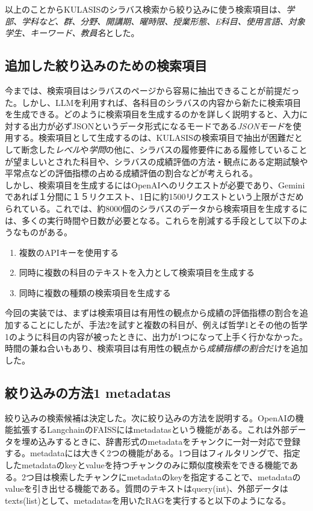 以上のことからKULASISのシラバス検索から絞り込みに使う検索項目は、\emph{学部、学科など、群、分野、開講期、曜時限、授業形態、E科目、使用言語、対象学生、キーワード、教員名}とした。\\

\subsection{追加した絞り込みのための検索項目}
今までは、検索項目はシラバスのページから容易に抽出できることが前提だった。しかし、LLMを利用すれば、各科目のシラバスの内容から新たに検索項目を生成できる。どのように検索項目を生成するのかを詳しく説明すると、入力に対する出力が必ずJSONというデータ形式になるモードである\emph{JSONモード}を使用する。検索項目として生成するのは、KULASISの検索項目で抽出が困難だとして断念した\emph{レベル}や\emph{学問}の他に、シラバスの履修要件にある履修していることが望ましいとされた科目や、シラバスの成績評価の方法・観点にある定期試験や平常点などの評価指標の占める成績評価の割合などが考えられる。\\

しかし、検索項目を生成するにはOpenAIへのリクエストが必要であり、Geminiであれば１分間に１５リクエスト、1日に約1500リクエストという上限がさだめられている。これでは、約8000個のシラバスのデータから検索項目を生成するには、多くの実行時間や日数が必要となる。これらを削減する手段として以下のようなものがある。\\

\begin{enumerate}
  \item 複数のAPIキーを使用する
  \item 同時に複数の科目のテキストを入力として検索項目を生成する
  \item 同時に複数の種類の検索項目を生成する
\end{enumerate}

今回の実装では、まずは検索項目は有用性の観点から成績の評価指標の割合を追加することにしたが、手法2を試すと複数の科目が、例えば哲学1とその他の哲学1のように科目の内容が被ったときに、出力が1つになって上手く行かなかった。時間の兼ね合いもあり、検索項目は有用性の観点から\emph{成績指標の割合}だけを追加した。

\subsection{絞り込みの方法1 metadatas}
絞り込みの検索候補は決定した。次に絞り込みの方法を説明する。OpenAIの機能拡張するLangchainのFAISSにはmetadatasという機能がある。これは外部データを埋め込みするときに、辞書形式のmetadataをチャンクに一対一対応で登録する。metadataには大きく2つの機能がある。1つ目はフィルタリングで、指定したmetadataのkeyとvalueを持つチャンクのみに類似度検索をできる機能である。2つ目は検索したチャンクにmetadataのkeyを指定することで、metadataのvalueを引き出せる機能である。質問のテキストはquery(int)、外部データはtexts(list)として、metadatasを用いたRAGを実行すると以下のようになる。\\

